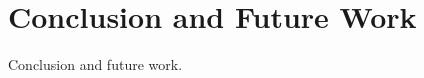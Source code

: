 \chapter{Conclusion and Future Work}
\label{sec:conclusion_and_future_work}

Conclusion and future work.
